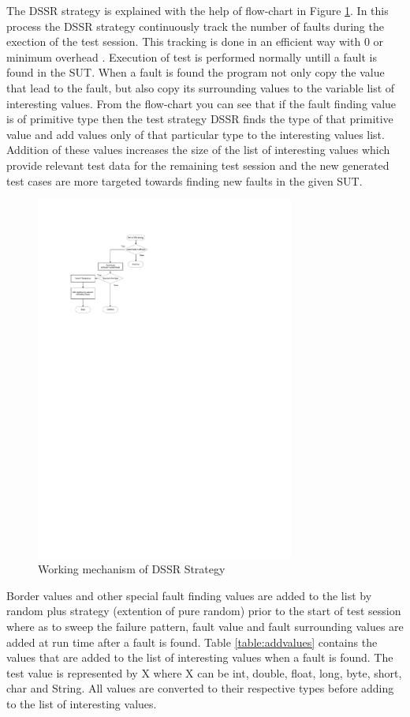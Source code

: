 \hspace{10 mm}The DSSR strategy is explained with the help of flow-chart in Figure \ref{fig:Working_DSSS}. In this process the DSSR strategy continuously track the number of faults during the exection of the test session. This tracking is done in an efficient way with 0 or minimum overhead \cite{Leitner2009}. Execution of test is performed normally untill a fault is found in the SUT. When a fault is found the program not only copy the value that lead to the fault, but also copy its surrounding values to the variable list of interesting values. From the flow-chart you can see that if the fault finding value is of primitive type then the test strategy DSSR finds the type of that primitive value and add values only of that particular type to the interesting values list. Addition of these values increases the size of the list of interesting values which provide relevant test data for the remaining test session and the new generated test cases are more targeted towards finding new faults in the given SUT.\\

\begin{figure}[htp]
\centering
\includegraphics[width=8.5cm,height=12cm]{figures/flowchart1.pdf}
\caption{Working mechanism of DSSR Strategy}
\label{fig:Working_DSSS}
\end{figure}

Border values and other special fault finding values are added to the list by random plus strategy (extention of pure random) prior to the start of test session where as to sweep the failure pattern, fault value and fault surrounding values are added at run time after a fault is found. Table \ref{table:addvalues} contains the values that are added to the list of interesting values when a fault is found. The test value is represented by X where X can be int, double, float, long, byte, short, char and String. All values are converted to their respective types before adding to the list of interesting values.

